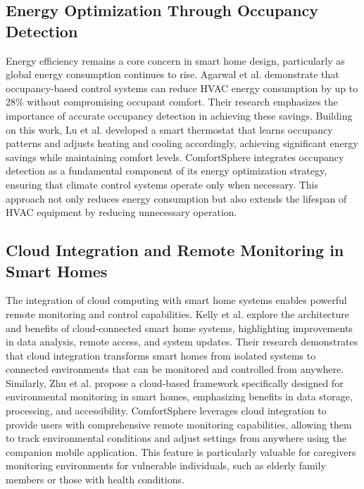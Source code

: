 \documentclass[a4paper]{scrartcl}
\begin{document}
    \subsection{Energy Optimization Through Occupancy Detection}
    Energy efficiency remains a core concern in smart home design, particularly as global energy consumption continues to rise. Agarwal et al. \cite{paper13} demonstrate that occupancy-based control systems can reduce HVAC energy consumption by up to 28\% without compromising occupant comfort. Their research emphasizes the importance of accurate occupancy detection in achieving these savings. Building on this work, Lu et al. \cite{paper14} developed a smart thermostat that learns occupancy patterns and adjusts heating and cooling accordingly, achieving significant energy savings while maintaining comfort levels. ComfortSphere integrates occupancy detection as a fundamental component of its energy optimization strategy, ensuring that climate control systems operate only when necessary. This approach not only reduces energy consumption but also extends the lifespan of HVAC equipment by reducing unnecessary operation.

    \subsection{Cloud Integration and Remote Monitoring in Smart Homes}
    The integration of cloud computing with smart home systems enables powerful remote monitoring and control capabilities. Kelly et al. \cite{paper15} explore the architecture and benefits of cloud-connected smart home systems, highlighting improvements in data analysis, remote access, and system updates. Their research demonstrates that cloud integration transforms smart homes from isolated systems to connected environments that can be monitored and controlled from anywhere. Similarly, Zhu et al. \cite{paper16} propose a cloud-based framework specifically designed for environmental monitoring in smart homes, emphasizing benefits in data storage, processing, and accessibility. ComfortSphere leverages cloud integration to provide users with comprehensive remote monitoring capabilities, allowing them to track environmental conditions and adjust settings from anywhere using the companion mobile application. This feature is particularly valuable for caregivers monitoring environments for vulnerable individuals, such as elderly family members or those with health conditions.
\end{document}
